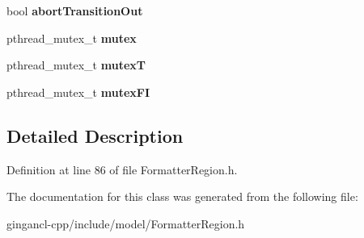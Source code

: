 \begin{CompactItemize}
\item 
bool {\bf abortTransitionOut}\label{classbr_1_1pucrio_1_1telemidia_1_1ginga_1_1ncl_1_1model_1_1presentation_1_1FormatterRegion_c9657097ac9f015dd979ef6ae5d015cd}

\item 
pthread\_\-mutex\_\-t {\bf mutex}\label{classbr_1_1pucrio_1_1telemidia_1_1ginga_1_1ncl_1_1model_1_1presentation_1_1FormatterRegion_4acff8232e4aec9cd5c6dc200ac55ef3}

\item 
pthread\_\-mutex\_\-t {\bf mutexT}\label{classbr_1_1pucrio_1_1telemidia_1_1ginga_1_1ncl_1_1model_1_1presentation_1_1FormatterRegion_ac4d8ae787d4c9b25763b056e27c6aae}

\item 
pthread\_\-mutex\_\-t {\bf mutexFI}\label{classbr_1_1pucrio_1_1telemidia_1_1ginga_1_1ncl_1_1model_1_1presentation_1_1FormatterRegion_4a6be55185e63a166c15e7e968466c2a}

\end{CompactItemize}


\subsection{Detailed Description}




Definition at line 86 of file FormatterRegion.h.

The documentation for this class was generated from the following file:\begin{CompactItemize}
\item 
gingancl-cpp/include/model/FormatterRegion.h\end{CompactItemize}

